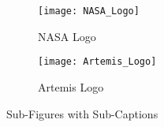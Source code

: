 \begin{figure}[H]
\begin{subfigure}[b]{0.5\textwidth}
   \centering 
   \texttt{[image: NASA\_Logo]}
   \caption{NASA Logo} 
   \label{fig:nasa-logo}
\end{subfigure}%
\begin{subfigure}[b]{0.5\textwidth}
   \centering 
   \texttt{[image: Artemis\_Logo]}
   \caption{Artemis Logo} 
   \label{fig:artemis-logo}
\end{subfigure}%
   \caption{Sub-Figures with Sub-Captions} 
   \label{fig:nasa-and-artemis-logos}
\end{figure}
